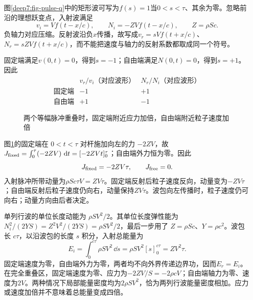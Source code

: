 \begin{solution}
图\ref{deep7:fig-pulse-q}中的矩形波可写为$f(s)=1$当$0<s<\tau$、其余为零。忽略前沿的理想跃变点，入射波满足
\[
 v_i=Vf(t-x/c),\qquad N_i=-ZVf(t-x/c),
 \qquad Z=\rho Sc.
\]
负轴力对应压缩。反射波沿负$x$传播，故写成$v_r=sVf(t+x/c)$、$N_r=sZVf(t+x/c)$，而不能把速度与轴力的反射系数都取成同一个符号。

固定端满足$v(0,t)=0$，得到$s=-1$；自由端满足$N(0,t)=0$，得到$s=+1$。因此
\[
 \begin{array}{c|cc}
 &v_r/v_i\text{（对应波形）}&N_r/N_i\text{（对应波形）}\\\hline
 \text{固定端}&-1&+1\\
 \text{自由端}&+1&-1
 \end{array}
\]
\begin{figure}[H]\centering
{}
\caption{两个等幅脉冲重叠时，固定端附近应力加倍，自由端附近粒子速度加倍}\label{deep7:fig-pulse-s}
\end{figure}
图\ref{deep7:fig-pulse-s}的固定端在 $0<t<\tau$ 对杆施加向左的力 $-2ZV$，故 $J_{\rm fixed}=\int_0^\tau(-2ZV)\,\mathop{}\!\mathrm d t=[-2ZVt]_0^\tau$；自由端外力恒为零。因此
\[
 J_{\rm fixed}=-2ZV\tau,\qquad J_{\rm free}=0.
\]
入射脉冲所带动量为$\rho Sc\tau V=ZV\tau$。固定端反射后粒子速度反向，动量变为$-ZV\tau$；自由端反射后粒子速度仍向右，动量保持$ZV\tau$。波包向左传播时，粒子速度仍可向右；动量方向由后者决定。

单列行波的单位长度动能为 $\rho SV^2/2$。其单位长度弹性能为 $N_i^2/(2YS)=Z^2V^2/(2YS)=\rho SV^2/2$，最后一步用了 $Z=\rho Sc$、$Y=\rho c^2$。波包长 $c\tau$，以沿波包的长度 $s$ 积分，入射总能量为
\[
 E_i=\int_0^{c\tau}\rho SV^2\,\dd s
 =\rho SV^2[s]_0^{c\tau}=ZV^2\tau.
\]
固定端速度为零，自由端外力为零，两者均不向外界传递边界功，因而$E_r=E_i$。在完全重叠区，固定端速度为零、应力为$-2ZV/S=-2\rho cV$；自由端轴力为零、速度为$2V$。两种情况下局部能量密度均为$2\rho SV^2$，恰为两列行波能量密度相加。应力或速度加倍并不意味着总能量变成四倍。
\end{solution}



